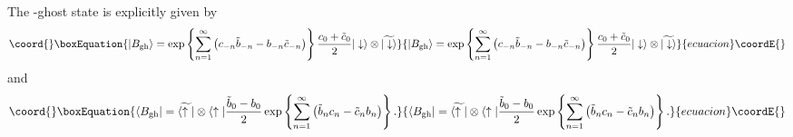 \documentclass[a4paper,prd,preprint]{revtex4}
\begin{document}
The \coordHE{}-ghost state \coordHE{} is explicitly given by
\begin{equation}\coord{}\boxEquation{
 | B_{\rm gh} \rangle
 = \exp\left\{
        \sum_{n=1}^\infty
         \left(
         c_{-n} {\tilde b}_{-n} - b_{-n} {\tilde c}_{-n}
         \right)
       \right\}
    {{c_0+{\tilde c}_0} \over 2}
   | \downarrow \rangle \otimes \widetilde{ | \downarrow \rangle}
}{
 | B_{\rm gh} \rangle
 = \exp\left\{
        \sum_{n=1}^\infty
         \left(
         c_{-n} {\tilde b}_{-n} - b_{-n} {\tilde c}_{-n}
         \right)
       \right\}
    {{c_0+{\tilde c}_0} \over 2}
   | \downarrow \rangle \otimes \widetilde{ | \downarrow \rangle}
}{ecuacion}\coordE{}\end{equation}
and
\begin{equation}\coord{}\boxEquation{
 \langle B_{\rm gh} |
 = \widetilde{ \langle \uparrow |} \otimes \langle \uparrow |
    {{{\tilde b}_0-b_0} \over 2}
        \exp
        \left\{
        \sum_{n=1}^\infty
        \left(
         {\tilde b}_n c_n - {\tilde c}_n b_n
        \right)
        \right\}.
}{
 \langle B_{\rm gh} |
 = \widetilde{ \langle \uparrow |} \otimes \langle \uparrow |
    {{{\tilde b}_0-b_0} \over 2}
        \exp
        \left\{
        \sum_{n=1}^\infty
        \left(
         {\tilde b}_n c_n - {\tilde c}_n b_n
        \right)
        \right\}.
}{ecuacion}\coordE{}\end{equation}
\end{document}

